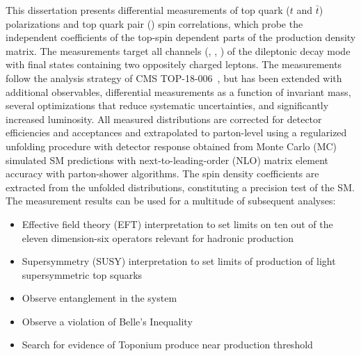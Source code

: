 This dissertation presents differential measurements of top quark ($t$ and $\bar{t}$) polarizations and top quark pair (\ttbar) spin correlations, which probe the independent coefficients of the top-spin dependent parts of the \ttbar production density matrix.
The measurements target all channels (\ee, \emu, \mumu) of the \ttbar dileptonic decay mode with final states containing two oppositely charged leptons.
The measurements follow the analysis strategy of CMS TOP-18-006~\cite{Sirunyan:2681777}, but has been extended with additional observables, differential measurements as a function of \ttbar invariant mass, several optimizations that reduce systematic uncertainties, and significantly increased luminosity.
All measured distributions are corrected for detector efficiencies and acceptances and extrapolated to parton-level using a regularized unfolding procedure with detector response obtained from Monte Carlo (MC) simulated SM predictions with next-to-leading-order (NLO) matrix element accuracy with parton-shower algorithms.
The spin density coefficients are extracted from the unfolded distributions, constituting a precision test of the SM.
The measurement results can be used for a multitude of subsequent analyses:
\begin{itemize}
    \item Effective field theory (EFT) interpretation to set limits on ten out of the eleven dimension-six operators relevant for hadronic \ttbar production~\cite{Sirunyan:2681777}
    \item Supersymmetry (SUSY) interpretation to set limits of production of light supersymmetric top squarks~\cite{CMS-PAS-FTR-18-034}
    \item Observe entanglement in the \ttbar system~\cite{Afik_2021}
    \item Observe a violation of Belle's Inequality~\cite{Aguilar_Saavedra_2022}
    \item Search for evidence of Toponium produce near \ttbar production threshold~\cite{PhysRevD.104.034023}
\end{itemize}

